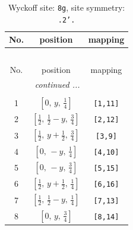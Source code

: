 \documentclass[fleqn,8pt]{jsarticle}
\begin{document}
\begin{longtable}{ccc}
\caption{Wyckoff site: {\tt 8g}, site symmetry: {\tt .2'.}}
 \\
 \hline \hline
No. & position & mapping \\ \hline \endfirsthead

\multicolumn{2}{l}{\tablename\ \thetable{}} \\
 \hline \hline
No. & position & mapping \\ \hline \endhead

 \hline \hline
\multicolumn{2}{r}{\footnotesize\it continued ...} \\ \endfoot

 \hline \hline
\multicolumn{2}{r}{} \\ \endlastfoot

1 & $\left[ 0,\, y,\, \frac{1}{4} \right]$ & {\tt [1,11]} \\ \hline
2 & $\left[ \frac{1}{2},\, \frac{1}{2} - y,\, \frac{3}{4} \right]$ & {\tt [2,12]} \\ \hline
3 & $\left[ \frac{1}{2},\, y + \frac{1}{2},\, \frac{3}{4} \right]$ & {\tt [3,9]} \\ \hline
4 & $\left[ 0,\, - y,\, \frac{1}{4} \right]$ & {\tt [4,10]} \\ \hline
5 & $\left[ 0,\, - y,\, \frac{3}{4} \right]$ & {\tt [5,15]} \\ \hline
6 & $\left[ \frac{1}{2},\, y + \frac{1}{2},\, \frac{1}{4} \right]$ & {\tt [6,16]} \\ \hline
7 & $\left[ \frac{1}{2},\, \frac{1}{2} - y,\, \frac{1}{4} \right]$ & {\tt [7,13]} \\ \hline
8 & $\left[ 0,\, y,\, \frac{3}{4} \right]$ & {\tt [8,14]} \\
\end{longtable}
\renewcommand{\arraystretch}{1.2}
\end{document}
